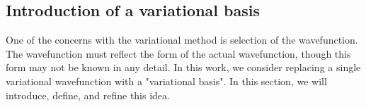 


%

\subsection{Introduction of a variational basis}
One of the concerns with the variational method is selection of the
wavefunction. The wavefunction must reflect the form of the actual wavefunction,
though this form may not be known in any detail. In this work, we consider
replacing a single variational wavefunction with a "variational basis". In this
section, we will introduce, define, and refine this idea. 

